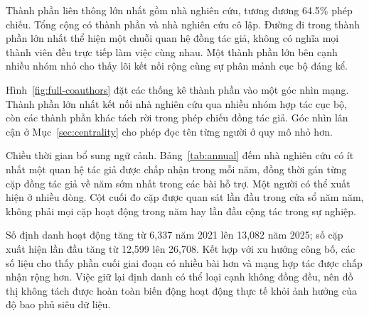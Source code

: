 
Thành phần liên thông lớn nhất gồm \LargestComponent{} nhà nghiên cứu, tương
đương 64.5\% phép chiếu. Tổng cộng có \ResearcherComponents{} thành phần và
\ResearcherIsolates{} nhà nghiên cứu cô lập. Đường đi trong thành phần lớn
nhất thể hiện một chuỗi quan hệ đồng tác giả, không có nghĩa mọi thành viên
đều trực tiếp làm việc cùng nhau. Một thành phần lớn bên cạnh nhiều nhóm nhỏ
cho thấy lõi kết nối rộng cùng sự phân mảnh cục bộ đáng kể.



Hình~\ref{fig:full-coauthors} đặt các thống kê thành phần vào một góc nhìn mạng.
Thành phần lớn nhất kết nối nhà nghiên cứu qua nhiều nhóm hợp tác cục bộ, còn
các thành phần khác tách rời trong phép chiếu đồng tác giả. Góc nhìn lân cận
ở Mục~\ref{sec:centrality} cho phép đọc tên từng người ở quy mô nhỏ hơn.
\FloatBarrier

Chiều thời gian bổ sung ngữ cảnh. Bảng~\ref{tab:annual} đếm nhà nghiên cứu có
ít nhất một quan hệ tác giả được chấp nhận trong mỗi năm, đồng thời gán từng
cặp đồng tác giả về năm sớm nhất trong các bài hỗ trợ. Một người có thể xuất
hiện ở nhiều dòng. Cột cuối đo cặp được quan sát lần đầu trong cửa sổ năm năm,
không phải mọi cặp hoạt động trong năm hay lần đầu cộng tác trong sự nghiệp.


\FloatBarrier

Số định danh hoạt động tăng từ 6,337 năm 2021 lên 13,082 năm 2025; số cặp xuất
hiện lần đầu tăng từ 12,599 lên 26,708. Kết hợp với xu hướng công bố, các số
liệu cho thấy phần cuối giai đoạn có nhiều bài hơn và mạng hợp tác được chấp
nhận rộng hơn. Việc giữ lại định danh có thể loại cạnh không đồng đều, nên đồ
thị không tách được hoàn toàn biến động hoạt động thực tế khỏi ảnh hưởng của
độ bao phủ siêu dữ liệu.

